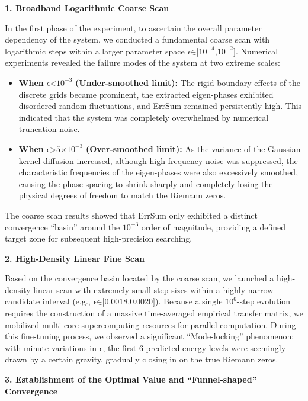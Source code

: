 \textbf{1. Broadband Logarithmic Coarse Scan}

In the first phase of the experiment, to ascertain the overall parameter
dependency of the system, we conducted a fundamental coarse scan with
logarithmic steps within a larger parameter space
\(\text{ϵ∈[}\text{10}^{\text{−4}}\text{,}\text{10}^{\text{−2}}\text{]}\).
Numerical experiments revealed the failure modes of the system at two
extreme scales:

\begin{itemize}
\item
  \textbf{When} \(\text{ϵ<}\text{10}^{\text{−3}}\)
  \textbf{(Under-smoothed limit):} The rigid boundary effects of the
  discrete grids became prominent, the extracted eigen-phases exhibited
  disordered random fluctuations, and ErrSum remained persistently high.
  This indicated that the system was completely overwhelmed by numerical
  truncation noise.
\item
  \textbf{When} \(\text{ϵ>5×}\text{10}^{\text{−3}}\)
  \textbf{(Over-smoothed limit):} As the variance of the Gaussian kernel
  diffusion increased, although high-frequency noise was suppressed, the
  characteristic frequencies of the eigen-phases were also excessively
  smoothed, causing the phase spacing to shrink sharply and completely
  losing the physical degrees of freedom to match the Riemann zeros.
\end{itemize}

The coarse scan results showed that ErrSum only exhibited a distinct
convergence ``basin'' around the \(\text{10}^{\text{−3}}\) order of
magnitude, providing a defined target zone for subsequent high-precision
searching.

\textbf{2. High-Density Linear Fine Scan}

Based on the convergence basin located by the coarse scan, we launched a
high-density linear scan with extremely small step sizes within a highly
narrow candidate interval (e.g., \(\text{ϵ∈[0.0018,0.0020]}\)). Because
a single \(\text{10}^{\text{6}}\)-step evolution requires the
construction of a massive time-averaged empirical transfer matrix, we
mobilized multi-core supercomputing resources for parallel computation.
During this fine-tuning process, we observed a significant
``Mode-locking'' phenomenon: with minute variations in \(\text{ϵ}\), the
first 6 predicted energy levels were seemingly drawn by a certain
gravity, gradually closing in on the true Riemann zeros.

\textbf{3. Establishment of the Optimal Value and ``Funnel-shaped''
Convergence}

